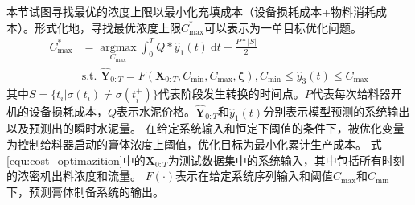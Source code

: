本节试图寻找最优的浓度上限以最小化充填成本（设备损耗成本+物料消耗成本）。形式化地，寻找最优浓度上限$C_{\max}^{*}$可以表示为一单目标优化问题。
\begin{equation}
    \begin{aligned}
       C^*_{\max}&=\mathop{\arg\max}\limits_{C_{\max}} \int_{0}^{T} Q*\hat{y}_{1}(t) \mathrm{~d}t + \frac{P*|S|}{2}\\
       &\text{s.t. } \hat{\boldsymbol{Y}}_{0: T}=F\left(\boldsymbol{X}_{0: T},C_{\min}, C_{\max},\boldsymbol{\zeta}\right),
       C_{\min}\leq \hat{y}_{3}(t) \leq C_{\max}
    \end{aligned}
    \label{equ:cost_optimazition}
    \end{equation}
其中$S=\{t_i|\sigma (t_i)\neq \sigma (t^+_i)\}$代表阶段发生转换的时间点。$P$代表每次给料器开机的设备损耗成本，$Q$表示水泥价格。$\hat{\boldsymbol{Y}}_{0: T}$和$\hat{y}_{1}(t)$分别表示模型预测的系统输出以及预测出的瞬时水泥量。
在给定系统输入和恒定下阈值的条件下，被优化变量为控制给料器启动的膏体浓度上阈值，优化目标为最小化累计生产成本。
式\eqref{equ:cost_optimazition}中的$\boldsymbol{X}_{0: T}$为测试数据集中的系统输入，其中包括所有时刻的浓密机出料浓度和流量。
$F(\cdot)$表示在给定系统序列输入和阈值$C_{\max}$和$C_{\min}$下，预测膏体制备系统的输出。

